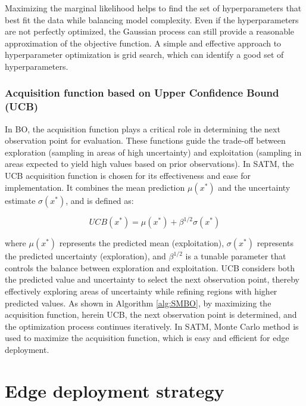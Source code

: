 \documentclass[a4paper,fleqn,numbers,sort&compress]{cas-sc}
\begin{document}
Maximizing the marginal likelihood helps to find the set of hyperparameters that best fit the data while balancing model complexity. Even if the hyperparameters are not perfectly optimized, the Gaussian process can still provide a reasonable approximation of the objective function. A simple and effective approach to hyperparameter optimization is grid search, which can identify a good set of hyperparameters.

\subsubsection{Acquisition function based on Upper Confidence Bound (UCB)}

In BO, the acquisition function plays a critical role in determining the next observation point for evaluation. These functions guide the trade-off between exploration (sampling in areas of high uncertainty) and exploitation (sampling in areas expected to yield high values based on prior observations). In SATM, the UCB acquisition function \citep{agrawal_bayesianoptimization_2021} is chosen for its effectiveness and ease for implementation. It combines the mean prediction $ \mu(x^*) $ and the uncertainty estimate $ \sigma(x^*) $, and is defined as:

\begin{equation}
    UCB(x^*) = \mu(x^*) + \beta^{1/2} \sigma(x^*)
\end{equation}

where $ \mu(x^*) $ represents the predicted mean (exploitation), $ \sigma(x^*) $ represents the predicted uncertainty (exploration), and $ \beta^{1/2} $ is a tunable parameter that controls the balance between exploration and exploitation. UCB considers both the predicted value and uncertainty to select the next observation point, thereby effectively exploring areas of uncertainty while refining regions with higher predicted values. As shown in Algorithm \ref{alg:SMBO}, by maximizing the acquisition function, herein UCB, the next observation point is determined, and the optimization process continues iteratively. In SATM, Monte Carlo method is used to maximize the acquisition function, which is easy and efficient for edge deployment.

\section{Edge deployment strategy} 
\label{sec:edge_deployment_strategy}
\end{document}
